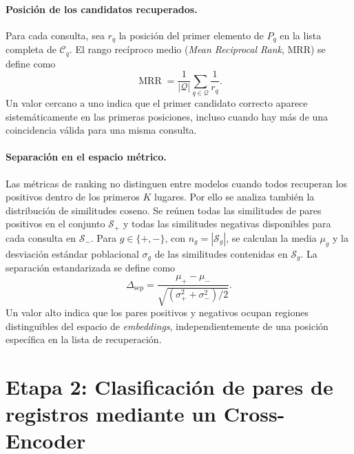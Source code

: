 \paragraph{Posición de los candidatos recuperados.}
Para cada consulta, sea $r_q$ la posición del primer elemento de $P_q$ en la lista completa de $\mathcal{C}_q$. El rango recíproco medio (\textit{Mean Reciprocal Rank}, MRR) se define como
\begin{equation}
    \operatorname{MRR} = \frac{1}{|\mathcal{Q}|}\sum_{q \in \mathcal{Q}}\frac{1}{r_q}.
    \label{eq:mrr}
\end{equation}
Un valor cercano a uno indica que el primer candidato correcto aparece sistemáticamente en las primeras posiciones, incluso cuando hay más de una coincidencia válida para una misma consulta.

\paragraph{Separación en el espacio métrico.}
Las métricas de ranking no distinguen entre modelos cuando todos recuperan los positivos dentro de los primeros $K$ lugares. Por ello se analiza también la distribución de similitudes coseno. Se reúnen todas las similitudes de pares positivos en el conjunto $\mathcal{S}_{+}$ y todas las similitudes negativas disponibles para cada consulta en $\mathcal{S}_{-}$. Para $g \in \{+,-\}$, con $n_g=|\mathcal{S}_g|$, se calculan la media $\mu_g$ y la desviación estándar poblacional $\sigma_g$ de las similitudes contenidas en $\mathcal{S}_g$. La separación estandarizada se define como
\begin{equation}
    \Delta_{\mathrm{sep}} =
    \frac{\mu_{+}-\mu_{-}}
    {\sqrt{\left(\sigma_{+}^{2}+\sigma_{-}^{2}\right)/2}}.
    \label{eq:delta_sep}
\end{equation}
Un valor alto indica que los pares positivos y negativos ocupan regiones distinguibles del espacio de \textit{embeddings}, independientemente de una posición específica en la lista de recuperación.

\section{Etapa 2: Clasificación de pares de registros mediante un Cross-Encoder}
\label{sec:cross_encoder}


